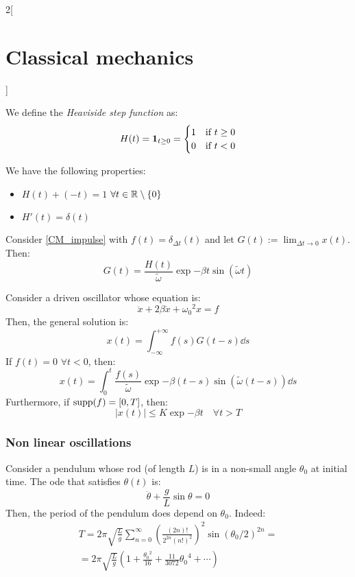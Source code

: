 \documentclass[../../../main.tex]{subfiles}
\begin{document}
\begin{multicols}{2}[\section{Classical mechanics}]
\begin{proposition}
  \end{proposition}
  \begin{definition}
    We define the \emph{Heaviside step function} as: $$H(t)=\boldsymbol{\mathrm{1}}_{t\geq 0}=
      \begin{cases}
        1 & \text{if }t\geq 0 \\
        0 & \text{if }t<0
      \end{cases}
    $$
  \end{definition}
  \begin{proposition}
    We have the following properties:
    \begin{itemize}
      \item $H(t)+(-t)=1$ $\forall t\in\mathbb{R}\setminus\{0\}$
      \item $H'(t)=\delta(t)$
    \end{itemize}
  \end{proposition}
  \begin{proposition}
    Consider \cref{CM_impulse} with $f(t)=\delta_{\Delta t}(t)$ and let $\displaystyle G(t):=\lim_{\Delta t\to 0}x(t)$. Then: $$G(t)=\frac{H(t)}{\tilde{\omega}}\exp{-\beta t}\sin(\tilde{\omega}t)$$
  \end{proposition}
  \begin{theorem}
    Consider a driven oscillator whose equation is:
    \begin{equation*}
      \ddot{x}+2\beta\dot{x}+{\omega_0}^2x=f
    \end{equation*}
    Then, the general solution is: $$x(t)=\int_{-\infty}^{+\infty}f(s)G(t-s)\dd{s}$$
    If $f(t)=0$ $\forall t<0$, then:
    $$x(t)=\int_0^t\frac{f(s)}{\tilde{\omega}}\exp{-\beta (t-s)}\sin(\tilde{\omega}(t-s))\dd{s}$$
    Furthermore, if $\operatorname{supp} (f)=[0,T]$, then: $$|x(t)|\leq K\exp{-\beta t}\quad\forall t> T$$
  \end{theorem}
  \subsubsection{Non linear oscillations}
  \begin{definition}
    Consider a pendulum whose rod (of length $L$) is in a non-small angle $\theta_0$ at initial time. The ode that satisfies $\theta(t)$ is:
    $$\ddot{\theta}+\frac{g}{L}\sin\theta=0$$
    Then, the period of the pendulum does depend on $\theta_0$. Indeed:
    \begin{multline*}
      T=2\pi\sqrt{\frac{L}{g}}\sum_{n=0}^\infty{\left(\frac{(2n)!}{2^{2n}{(n!)}^2}\right)}^2{\sin(\theta_0/2)}^{2n}=\\=2\pi\sqrt{\frac{L}{g}}\left(1+\frac{{\theta_0}^2}{16}+\frac{11}{3072}{\theta_0}^4+\cdots\right)
    \end{multline*}
  \end{definition}

\end{multicols}
\end{document}
